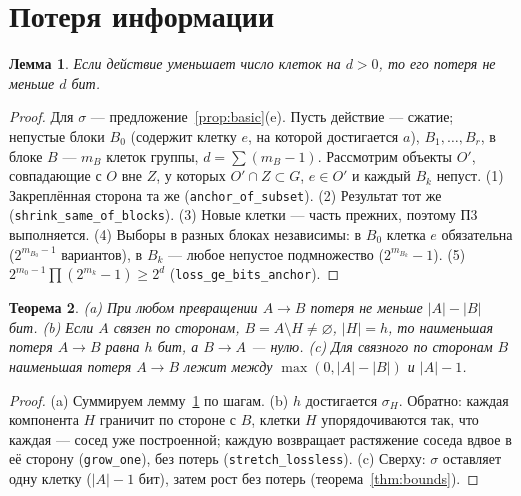 \documentclass[11pt,a4paper]{article}
\theoremstyle{plain}
\newtheorem{theorem}{Теорема}[section]
\newtheorem{lemma}[theorem]{Лемма}
\theoremstyle{definition}
\theoremstyle{remark}
\newcommand{\lean}[1]{\texttt{#1}}
\begin{document}
\section{Потеря информации}\label{sec:loss}

\begin{lemma}\label{lem:bit}
Если действие уменьшает число клеток на $d>0$, то его потеря не меньше $d$ бит.
\end{lemma}
\begin{proof}
Для $\sigma$ — предложение~\ref{prop:basic}(e). Пусть действие — сжатие; непустые блоки $B_0$ (содержит клетку $e$, на которой достигается $a$), $B_1,\dots,B_r$, в блоке $B$ — $m_B$ клеток группы, $d=\sum(m_B-1)$. Рассмотрим объекты $O'$, совпадающие с $O$ вне $Z$, у которых $O'\cap Z\subset G$, $e\in O'$ и каждый $B_k$ непуст. (1) Закреплённая сторона та же (\lean{anchor\_of\_subset}). (2) Результат тот же (\lean{shrink\_same\_of\_blocks}). (3) Новые клетки — часть прежних, поэтому П3 выполняется. (4) Выборы в разных блоках независимы: в $B_0$ клетка $e$ обязательна ($2^{m_{B_0}-1}$ вариантов), в $B_k$ — любое непустое подмножество ($2^{m_{B_k}}-1$). (5) $2^{m_0-1}\prod(2^{m_k}-1)\ge2^d$ (\lean{loss\_ge\_bits\_anchor}).
\end{proof}

\begin{theorem}\label{thm:loss}
(a) При любом превращении $A\to B$ потеря не меньше $|A|-|B|$ бит. (b) Если $A$ связен по сторонам, $B=A\setminus H\ne\varnothing$, $|H|=h$, то наименьшая потеря $A\to B$ равна $h$ бит, а $B\to A$ — нулю. (c) Для связного по сторонам $B$ наименьшая потеря $A\to B$ лежит между $\max(0,|A|-|B|)$ и $|A|-1$.
\end{theorem}
\begin{proof}
(a) Суммируем лемму~\ref{lem:bit} по шагам. (b) $h$ достигается $\sigma_H$. Обратно: каждая компонента $H$ граничит по стороне с $B$, клетки $H$ упорядочиваются так, что каждая — сосед уже построенной; каждую возвращает растяжение соседа вдвое в её сторону (\lean{grow\_one}), без потерь (\lean{stretch\_lossless}). (c) Сверху: $\sigma$ оставляет одну клетку ($|A|-1$ бит), затем рост без потерь (теорема~\ref{thm:bounds}).
\end{proof}
\end{document}
